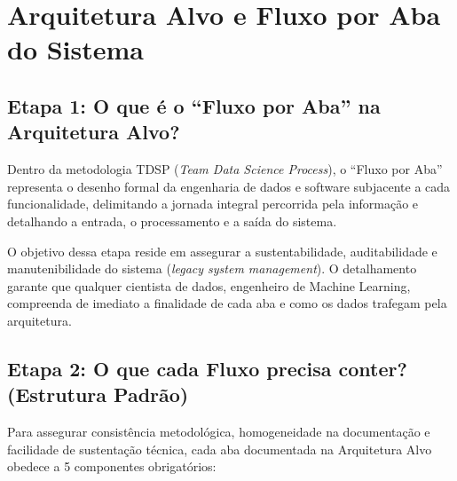 \section{Arquitetura Alvo e Fluxo por Aba do Sistema}

\subsection{Etapa 1: O que é o ``Fluxo por Aba'' na Arquitetura Alvo?}

Dentro da metodologia TDSP (\textit{Team Data Science Process}), o ``Fluxo por Aba'' representa o desenho formal da engenharia de dados e software subjacente a cada funcionalidade, delimitando a jornada integral percorrida pela informação e detalhando a entrada, o processamento e a saída do sistema.

O objetivo dessa etapa reside em assegurar a sustentabilidade, auditabilidade e manutenibilidade do sistema (\textit{legacy system management}). O detalhamento garante que qualquer cientista de dados, engenheiro de Machine Learning, compreenda de imediato a finalidade de cada aba e como os dados trafegam pela arquitetura.

\subsection{Etapa 2: O que cada Fluxo precisa conter? (Estrutura Padrão)}

Para assegurar consistência metodológica, homogeneidade na documentação e facilidade de sustentação técnica, cada aba documentada na Arquitetura Alvo obedece a 5 componentes obrigatórios:

